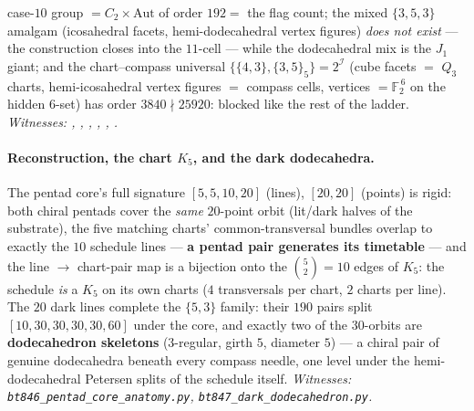 \documentclass[11pt]{article}
\newcommand{\GF}[1]{\mathbb{F}_{#1}}
\begin{document}
case-$10$ group $=C_2\times\mathrm{Aut}$ of order $192=$ the flag
count; the mixed $\{3,5,3\}$ amalgam (icosahedral facets,
hemi-dodecahedral vertex figures) \emph{does not exist} --- the
construction closes into the $11$-cell --- while the dodecahedral mix
is the $J_1$ giant; and the chart--compass universal
$\{\{4,3\},\{3,5\}_5\}=2^{\mathcal I}$ (cube facets $=$ $Q_3$
charts, hemi-icosahedral vertex figures $=$ compass cells, vertices
$=\GF2^{\,6}$ on the hidden $6$-set) has order $3840\nmid25920$:
blocked like the rest of the ladder.
\emph{Witnesses: ,
,
,
,
, .}

\paragraph{Reconstruction, the chart $K_5$, and the dark dodecahedra.}
The pentad core's full signature $[5,5,10,20]$ (lines), $[20,20]$
(points) is rigid: both chiral pentads cover the \emph{same}
$20$-point orbit (lit/dark halves of the substrate), the five
matching charts' common-transversal bundles overlap to exactly the
$10$ schedule lines --- \textbf{a pentad pair generates its
timetable} --- and the line $\to$ chart-pair map is a bijection onto
the $\binom52=10$ edges of $K_5$: the schedule \emph{is} a $K_5$ on
its own charts ($4$ transversals per chart, $2$ charts per line).
The $20$ dark lines complete the $\{5,3\}$ family: their $190$ pairs
split $[10,30,30,30,30,60]$ under the core, and exactly two of the
$30$-orbits are \textbf{dodecahedron skeletons} ($3$-regular, girth
$5$, diameter $5$) --- a chiral pair of genuine dodecahedra beneath
every compass needle, one level under the hemi-dodecahedral Petersen
splits of the schedule itself.
\emph{Witnesses: \texttt{bt846\_pentad\_core\_anatomy.py},
\texttt{bt847\_dark\_dodecahedron.py}.}
\end{document}
